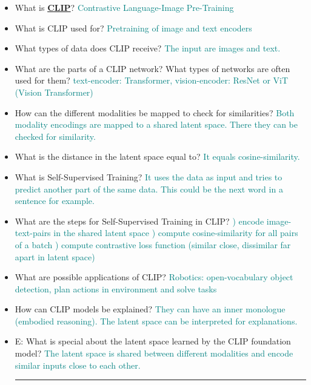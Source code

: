 \documentclass{report}
\newcommand{\asw}[2][teal]{}
\renewcommand{\asw}[2][teal]{\textcolor{#1}{#2}}
\begin{document}
\begin{itemize}
		\item What is \textbf{\underline{CLIP}}?
		\asw{\newline Contrastive Language-Image Pre-Training}
		\item What is CLIP used for?
		\asw{\newline Pretraining of image and text encoders}
		\item What types of data does CLIP receive?
		\asw{\newline The input are images and text.}
		\item What are the parts of a CLIP network? What types of networks are often used for them?
		\asw{\newline text-encoder: Transformer, vision-encoder: ResNet or ViT (Vision Transformer)}
		\item How can the different modalities be mapped to check for similarities?
		\asw{\newline Both modality encodings are mapped to a shared latent space. There they can be checked for similarity.}
		\item What is the distance in the latent space equal to?
		\asw{\newline It equals cosine-similarity.}
		\item What is Self-Supervised Training?
		\asw{\newline It uses the data as input and tries to predict another part of the same data. This could be the next word in a sentence for example.}
		\item What are the steps for Self-Supervised Training in CLIP?
		\asw{) encode image-text-pairs in the shared latent space
			\newline 2) compute cosine-similarity for all pairs of a batch
			\newline 3) compute contrastive loss function (similar close, dissimilar far apart in latent space)}
		\item What are possible applications of CLIP?
		\asw{\newline Robotics: open-vocabulary object detection, plan actions in environment and solve tasks}
		\item How can CLIP models be explained?
		\asw{\newline They can have an inner monologue (embodied reasoning). The latent space can be interpreted for explanations.}
		\item E: What is special about the latent space learned by the CLIP foundation model?
		\asw{\newline The latent space is shared between different modalities and encode similar inputs close to each other.}
		\newline
		\hrule 
		

\end{itemize}
\end{document}
